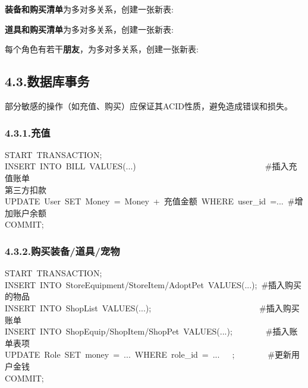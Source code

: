 \documentclass{article}
\begin{document}
\noindent{}\textbf{装备和购买清单}为多对多关系，创建一张新表:%


\mdhr{}%

\noindent{}\textbf{道具和购买清单}为多对多关系，创建一张新表:%


\mdhr{}%

\noindent{}每个角色有若干\textbf{朋友}，为多对多关系，创建一张新表:%


\subsection{4.3.\hspace*{0.5em}数据库事务}\label{43}%

\noindent{}部分敏感的操作（如充值、购买）应保证其ACID性质，避免造成错误和损失。%

\subsubsection{4.3.1.\hspace*{0.5em}充值}\label{431}%
\begin{mdpre}%
\noindent START~TRANSACTION;\\
INSERT~INTO~BILL~VALUES(...)~~~~~~~~~~~~~~~~~~~~~~~~~~~~~~~\#插入充值账单\\
第三方扣款\\
UPDATE~User~SET~Money~=~Money~+~充值金额~WHERE~user\_id~=...~\#增加账户余额\\
COMMIT;%
\end{mdpre}
\subsubsection{4.3.2.\hspace*{0.5em}购买装备/道具/宠物}\label{432}%
\begin{mdpre}%
\noindent START~TRANSACTION;\\
INSERT~INTO~StoreEquipment/StoreItem/AdoptPet~VALUES(...);~\#插入购买的物品\\
INSERT~INTO~ShopList~VALUES(...);~~~~~~~~~~~~~~~~~~~~~~~~~~\#插入购买账单\\
INSERT~INTO~ShopEquip/ShopItem/ShopPet~VALUES(...);~~~~~~~~\#插入账单表项\\
UPDATE~Role~SET~money~=~...~WHERE~role\_id~=~...~~~;~~~~~~~~\#更新用户金钱\\
COMMIT;%
\end{mdpre}
\end{document}
